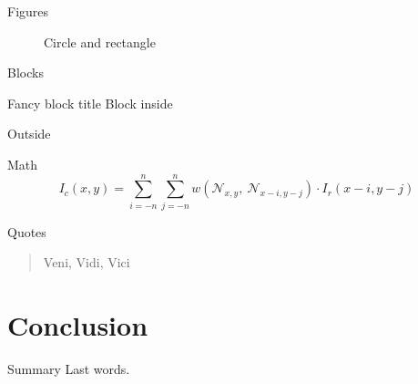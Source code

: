 \documentclass[compress]{beamer}
\begin{document}
\begin{frame}{Figures}
  \begin{figure}
    \caption{Circle and rectangle}
  \end{figure}
\end{frame}

\begin{frame}{Blocks}
  \begin{block}{Fancy block title}
    Block inside
  \end{block}

  Outside
\end{frame}

\begin{frame}{Math}
  \begin{equation*}
    I_c(x,y) = \sum_{i=-n}^n\sum_{j=-n}^n w\left(
      \mathcal{N}_{x,y},\ \mathcal{N}_{x-i, y-j}\right)
      \cdot
      I_r(x-i,y-j)
  \end{equation*}
\end{frame}

\begin{frame}{Quotes}
  \begin{quote}
    Veni, Vidi, Vici
  \end{quote}
\end{frame}

\section{Conclusion}

\begin{frame}{Summary}
  Last words.
\end{frame}

\end{document}
